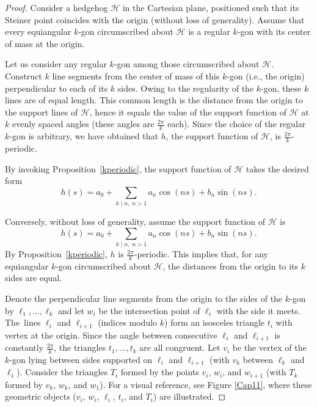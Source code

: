 \documentclass{amsart}
\theoremstyle{definition}
\numberwithin{equation}{section}
\begin{document}
\begin{proof}
Consider a hedgehog $\mathcal{H}$ in the Cartesian plane, positioned such that its Steiner point coincides with the origin (without loss of generality).  
Assume that every equiangular $k$-gon circumscribed about $\mathcal{H}$ is a regular $k$-gon with its center of mass at the origin.

Let us consider any regular $k$-gon among those circumscribed about $\mathcal{H}$. Construct $k$ line segments from the center of mass of this $k$-gon (i.e., the origin) perpendicular to each of its $k$ sides. Owing to the regularity of the $k$-gon, these $k$ lines are of equal length.  
This common length is the distance from the origin to the support lines of $\mathcal{H}$, hence it equals the value of the support function of $\mathcal{H}$ at $k$ evenly spaced angles (these angles are $\frac{2\pi}{k}$ each). Since the choice of the regular $k$-gon is arbitrary, we have obtained that $h$, the support function of $\mathcal{H}$, is $\frac{2\pi}{k}$-periodic.

By invoking Proposition~\ref{kperiodic}, the support function of $\mathcal{H}$ takes the desired form
\[
h(s) = a_0 + \sum_{k\mid n, \;n>1} a_n \cos(ns) + b_n \sin(ns).
\]

Conversely, without loss of generality, assume the support function of $\mathcal{H}$ is
\[
h(s) = a_0 + \sum_{k\mid n, \;n>1} a_n \cos(ns) + b_n \sin(ns).
\]
By Proposition~\ref{kperiodic}, $h$ is $\frac{2\pi}{k}$-periodic.  
This implies that, for any equiangular $k$-gon circumscribed about $\mathcal{H}$, the distances from the origin to its $k$ sides are equal.

Denote the perpendicular line segments from the origin to the sides of the \linebreak $k$-gon by $\ell_1,\dots,\ell_k$ and let $w_i$ be the intersection point of $\ell_i$ with the side it meets.  
The~lines $\ell_i$ and $\ell_{i+1}$ (indices modulo $k$) form an isosceles triangle $t_i$ with vertex at the origin.  
Since the angle between consecutive $\ell_i$ and $\ell_{i+1}$ is constantly $\frac{2\pi}{k}$, the triangles $t_1,\dots,t_k$ are all congruent. Let $v_i$ be the vertex of the $k$-gon lying between sides supported on $\ell_i$ and $\ell_{i+1}$ (with $v_k$ between $\ell_k$ and $\ell_1$).  
Consider the triangles $T_i$ formed by the points $v_i$, $w_i$, and $w_{i+1}$ (with $T_k$ formed by $v_k$, $w_k$, and $w_1$). For a visual reference, see Figure \ref{Cap11}, where these geometric objects ($v_i$, $w_i$, $\ell_i$, $t_i$, and $T_i$) are illustrated.


\end{proof}
\end{document}
